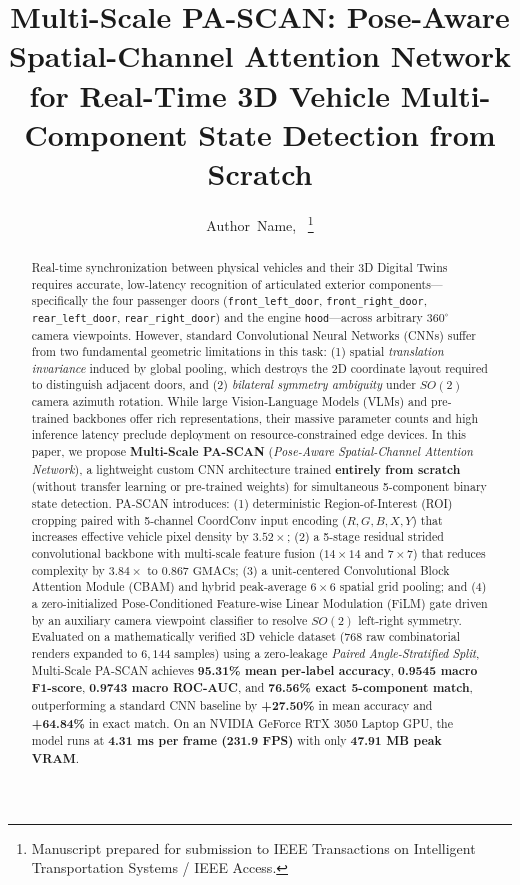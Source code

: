\documentclass[journal]{IEEEtran}
\begin{document}
\title{Multi-Scale PA-SCAN: Pose-Aware Spatial-Channel Attention Network for Real-Time 3D Vehicle Multi-Component State Detection from Scratch}

\author{Author~Name,~%
\thanks{Manuscript prepared for submission to IEEE Transactions on Intelligent Transportation Systems / IEEE Access.}}

\maketitle

\begin{abstract}
Real-time synchronization between physical vehicles and their 3D Digital Twins requires accurate, low-latency recognition of articulated exterior components---specifically the four passenger doors (\texttt{front\_left\_door}, \texttt{front\_right\_door}, \texttt{rear\_left\_door}, \texttt{rear\_right\_door}) and the engine \texttt{hood}---across arbitrary $360^\circ$ camera viewpoints. However, standard Convolutional Neural Networks (CNNs) suffer from two fundamental geometric limitations in this task: (1) spatial \emph{translation invariance} induced by global pooling, which destroys the 2D coordinate layout required to distinguish adjacent doors, and (2) \emph{bilateral symmetry ambiguity} under $SO(2)$ camera azimuth rotation. While large Vision-Language Models (VLMs) and pre-trained backbones offer rich representations, their massive parameter counts and high inference latency preclude deployment on resource-constrained edge devices. In this paper, we propose \textbf{Multi-Scale PA-SCAN} (\emph{Pose-Aware Spatial-Channel Attention Network}), a lightweight custom CNN architecture trained \textbf{entirely from scratch} (without transfer learning or pre-trained weights) for simultaneous 5-component binary state detection. PA-SCAN introduces: (1) deterministic Region-of-Interest (ROI) cropping paired with 5-channel CoordConv input encoding ($R, G, B, X, Y$) that increases effective vehicle pixel density by $3.52\times$; (2) a 5-stage residual strided convolutional backbone with multi-scale feature fusion ($14\times 14$ and $7\times 7$) that reduces complexity by $3.84\times$ to $0.867\text{ GMACs}$; (3) a unit-centered Convolutional Block Attention Module (CBAM) and hybrid peak-average $6\times 6$ spatial grid pooling; and (4) a zero-initialized Pose-Conditioned Feature-wise Linear Modulation (FiLM) gate driven by an auxiliary camera viewpoint classifier to resolve $SO(2)$ left-right symmetry. Evaluated on a mathematically verified 3D vehicle dataset ($768$ raw combinatorial renders expanded to $6,144$ samples) using a zero-leakage \emph{Paired Angle-Stratified Split}, Multi-Scale PA-SCAN achieves \textbf{95.31\% mean per-label accuracy}, \textbf{0.9545 macro F1-score}, \textbf{0.9743 macro ROC-AUC}, and \textbf{76.56\% exact 5-component match}, outperforming a standard CNN baseline by \textbf{+27.50\%} in mean accuracy and \textbf{+64.84\%} in exact match. On an NVIDIA GeForce RTX 3050 Laptop GPU, the model runs at \textbf{4.31 ms per frame (231.9 FPS)} with only \textbf{47.91 MB peak VRAM}.
\end{abstract}
\end{document}
